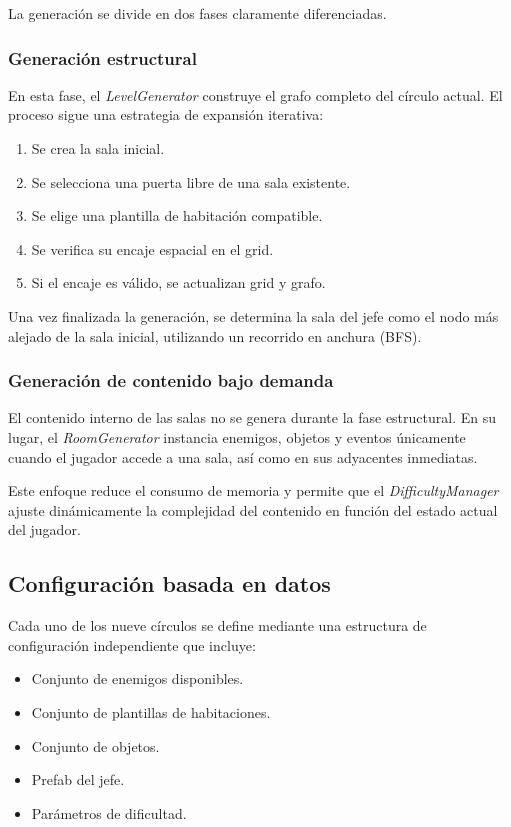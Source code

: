 La generación se divide en dos fases claramente diferenciadas.

\subsubsection{Generación estructural}

En esta fase, el \textit{LevelGenerator} construye el grafo completo del círculo actual. El proceso sigue una estrategia de expansión iterativa:

\begin{enumerate}
    \item Se crea la sala inicial.
    \item Se selecciona una puerta libre de una sala existente.
    \item Se elige una plantilla de habitación compatible.
    \item Se verifica su encaje espacial en el grid.
    \item Si el encaje es válido, se actualizan grid y grafo.
\end{enumerate}

Una vez finalizada la generación, se determina la sala del jefe como el nodo más alejado de la sala inicial, utilizando un recorrido en anchura (BFS).

\subsubsection{Generación de contenido bajo demanda}

El contenido interno de las salas no se genera durante la fase estructural. En su lugar, el \textit{RoomGenerator} instancia enemigos, objetos y eventos únicamente cuando el jugador accede a una sala, así como en sus adyacentes inmediatas.

Este enfoque reduce el consumo de memoria y permite que el \textit{DifficultyManager} ajuste dinámicamente la complejidad del contenido en función del estado actual del jugador.

\subsection{Configuración basada en datos}

Cada uno de los nueve círculos se define mediante una estructura de configuración independiente que incluye:

\begin{itemize}
    \item Conjunto de enemigos disponibles.
    \item Conjunto de plantillas de habitaciones.
    \item Conjunto de objetos.
    \item Prefab del jefe.
    \item Parámetros de dificultad.
\end{itemize}

